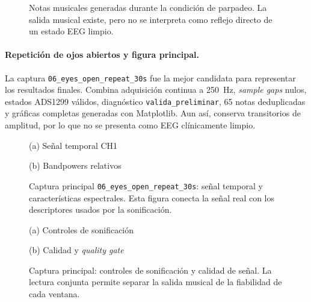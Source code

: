 \begin{figure}[htbp]
    \centering
    \caption{Notas musicales generadas durante la condición de parpadeo. La salida musical existe, pero no se interpreta como reflejo directo de un estado EEG limpio.}
    \label{fig:validacion_s01_04_notes}
\end{figure}

\paragraph{Repetición de ojos abiertos y figura principal.}
La captura \texttt{06\_eyes\_open\_repeat\_30s} fue la mejor candidata para representar los resultados finales. Combina adquisición continua a \SI{250}{\hertz}, \textit{sample gaps} nulos, estados ADS1299 válidos, diagnóstico \texttt{valida\_preliminar}, 65 notas deduplicadas y gráficas completas generadas con Matplotlib. Aun así, conserva transitorios de amplitud, por lo que no se presenta como EEG clínicamente limpio.

\begin{figure}[htbp]
    \centering
    \begin{minipage}{0.49\textwidth}
        \centering
        \small (a) Señal temporal CH1
    \end{minipage}
    \hfill
    \begin{minipage}{0.49\textwidth}
        \centering
        \small (b) Bandpowers relativos
    \end{minipage}
    \caption{Captura principal \texttt{06\_eyes\_open\_repeat\_30s}: señal temporal y características espectrales. Esta figura conecta la señal real con los descriptores usados por la sonificación.}
    \label{fig:validacion_s01_06_eeg_bands}
\end{figure}

\begin{figure}[htbp]
    \centering
    \begin{minipage}{0.49\textwidth}
        \centering
        \small (a) Controles de sonificación
    \end{minipage}
    \hfill
    \begin{minipage}{0.49\textwidth}
        \centering
        \small (b) Calidad y \textit{quality gate}
    \end{minipage}
    \caption{Captura principal: controles de sonificación y calidad de señal. La lectura conjunta permite separar la salida musical de la fiabilidad de cada ventana.}
    \label{fig:validacion_s01_06_controls_quality}
\end{figure}

